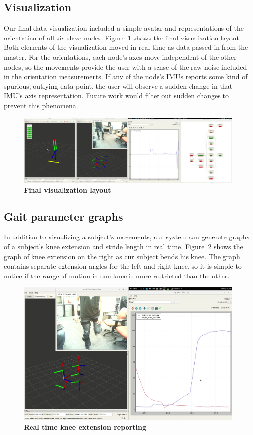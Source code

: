 \documentclass[conference]{IEEEtran}
\begin{document}
\subsection{Visualization}
Our final data visualization included a simple avatar and representations of the
orientation of all six slave nodes. Figure~\ref{fig:vis} shows the final visualization layout.
Both elements of the visualization moved in real time as data passed in from the master.
For the orientations, each node's axes move independent of the other nodes, so the
movements provide the user with a sense of the raw noise included in the orientation
measurements. If any of the node's IMUs reports some kind of spurious, outlying data
point, the user will observe a sudden change in that IMU's axis representation. Future
work would filter out sudden changes to prevent this phenomena. 

\begin{figure}[h]
  \centering
  \includegraphics[width=0.95\columnwidth]{figs/vis}
  \caption{{\bf Final visualization layout}}
  \label{fig:vis}
\end{figure}

\subsection{Gait parameter graphs}
In addition to visualizing a subject's movements, our system can generate graphs of a
subject's knee extension and stride length in real time. Figure~\ref{fig:extend} shows the
graph of knee extension on the right as our subject bends his knee. The graph contains
separate extension angles for the left and right knee, so it is simple to notice if the
range of motion in one knee is more restricted than the other. 

\begin{figure}[h]
  \centering
  \includegraphics[width=0.95\columnwidth]{figs/extend}
  \caption{{\bf Real time knee extension reporting}}
  \label{fig:extend}
\end{figure}
\end{document}
